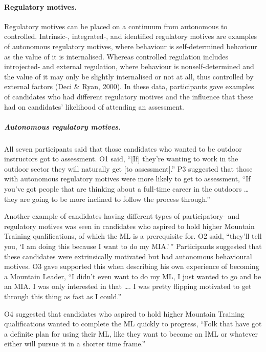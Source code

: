\documentclass[a4paper,]{book}
\let\oldparagraph\paragraph
\renewcommand{\paragraph}[1]{\oldparagraph{#1}\mbox{}}
\let\oldsubparagraph\subparagraph
\renewcommand{\subparagraph}[1]{\oldsubparagraph{#1}\mbox{}}
\begin{document}
\hypertarget{regulatory-motives.}{%
\paragraph{Regulatory motives.}\label{regulatory-motives.}}

Regulatory motives can be placed on a continuum from autonomous to controlled. Intrinsic-, integrated-, and identified regulatory motives are examples of autonomous regulatory motives, where behaviour is self-determined behaviour as the value of it is internalised. Whereas controlled regulation includes introjected- and external regulation, where behaviour is nonself-determined and the value of it may only be slightly internalised or not at all, thus controlled by external factors (Deci \& Ryan, 2000). In these data, participants gave examples of candidates who had different regulatory motives and the influence that these had on candidates' likelihood of attending an assessment.

\hypertarget{autonomous-regulatory-motives.}{%
\subparagraph{Autonomous regulatory motives.}\label{autonomous-regulatory-motives.}}

All seven participants said that those candidates who wanted to be outdoor instructors got to assessment. O1 said, ``{[}If{]} they're wanting to work in the outdoor sector they will naturally get {[}to assessment{]}.'' P3 suggested that those with autonomous regulatory motives were more likely to get to assessment, ``If you've got people that are thinking about a full-time career in the outdoors \ldots{} they are going to be more inclined to follow the process through.''

Another example of candidates having different types of participatory- and regulatory motives was seen in candidates who aspired to hold higher Mountain Training qualifications, of which the ML is a prerequisite for. O2 said, ``they'll tell you, `I am doing this because I want to do my MIA.'\,'' Participants suggested that these candidates were extrinsically motivated but had autonomous behavioural motives. O3 gave supported this when describing his own experience of becoming a Mountain Leader, ``I didn't even want to do my ML, I just wanted to go and be an MIA. I was only interested in that \ldots{}. I was pretty flipping motivated to get through this thing as fast as I could.''

O4 suggested that candidates who aspired to hold higher Mountain Training qualifications wanted to complete the ML quickly to progress, ``Folk that have got a definite plan for using their ML, like they want to become an IML or whatever either will pursue it in a shorter time frame.''
\end{document}
